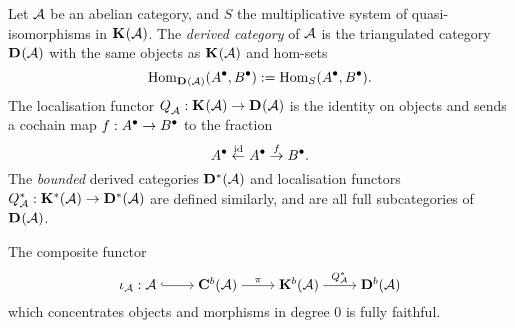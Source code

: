 \begin{definition}
  Let $\abcat{A}$ be an abelian category, and $S$ the multiplicative
  system of quasi-isomorphisms in $\homcat{\abcat{A}}$.
  The \emph{derived category} of $\abcat{A}$ is the triangulated
  category $\dercat{\abcat{A}}$ with the same objects as
  $\homcat{\abcat{A}}$ and hom-sets
  \[
    \Hom_{\dercat{\abcat{A}}}(\cochaincomp{A}, \cochaincomp{B}) :=
    \Hom_S(\cochaincomp{A}, \cochaincomp{B}).
  \]
  The localisation functor $\dercatlocln{\abcat{A}}:
  \homcat{\abcat{A}} \to \dercat{\abcat{A}}$ is the identity on
  objects and sends a cochain map $f: \cochaincomp{A} \to
  \cochaincomp{B}$ to the fraction
  \[
    \leftfrac{\cochaincomp{A}}{\id}{\cochaincomp{A}}{f}{\cochaincomp{B}}.
  \]
  The \emph{bounded} derived categories $\dercat[*]{\abcat{A}}$ and
  localisation functors $\dercatlocln[*]{\abcat{A}}:
  \homcat[*]{\abcat{A}} \to \dercat[*]{\abcat{A}}$ are defined
  similarly, and are all full subcategories of $\dercat{\abcat{A}}$.
\end{definition}

\begin{proposition}
  The composite functor
  \[
    \begin{tikzcd}[cramped]
      \iota_{\abcat{A}}: {\abcat{A}} & {\Ch[b]{\abcat{A}}} &
      {\homcat[b]{\abcat{A}}} & {\dercat[b]{\abcat{A}}}
      \arrow[hook, from=1-1, to=1-2]
      \arrow["\pi", from=1-2, to=1-3]
      \arrow["{\dercatlocln[*]{\abcat{A}}}", from=1-3, to=1-4]
    \end{tikzcd}
  \]
  which concentrates objects and morphisms in degree 0 is fully faithful.
\end{proposition}

\iffalse
\begin{proposition}[{\cite[Corollaries~10.3.9--10]{weibel}}]
  \label{prop_locln_properties_of_dercat}
  \begin{enumerate}
    \item
      Two complexes $\cochaincomp{A}$ and $\cochaincomp{B}$ in
      $\Ch{\abcat{A}}$ are isomorphic in $\dercat{\abcat{A}}$ if and only
      if they are quasi-isomorphic in $\homcat{\abcat{A}}$.
      Thus $\cochaincomp{A}$ is zero if and only if it is exact/acyclic.

    \item
      Two cochain maps $f,\, g: \cochaincomp{A} \to
      \cochaincomp{B}$ are the same in $\dercat{\abcat{A}}$ if and only
      if $sf = sg$ for some quasi-isomorphism $s: \cochaincomp{B} \to
      \cochaincomp{C}$.
      Thus $f$ is zero in $\dercat{\abcat{A}}$ if and only if
      $sf$ is null-homotopic.
  \end{enumerate}
\end{proposition}
\fi

